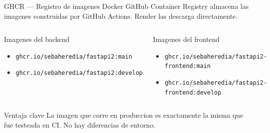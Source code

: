 \documentclass[aspectratio=169]{beamer}
\begin{document}
\begin{frame}{GHCR --- Registro de imagenes Docker}
  GitHub Container Registry almacena las imagenes construidas por GitHub Actions. Render las descarga directamente.

  \vspace{0.3cm}

  \begin{center}
  \end{center}

  \vspace{0.3cm}

  \begin{columns}
    \begin{block}{Imagenes del backend}
      \begin{itemize}
        \item \texttt{ghcr.io/sebaheredia/fastapi2:main}
        \item \texttt{ghcr.io/sebaheredia/fastapi2:develop}
      \end{itemize}
    \end{block}

    \begin{block}{Imagenes del frontend}
      \begin{itemize}
        \item \texttt{ghcr.io/sebaheredia/fastapi2-frontend:main}
        \item \texttt{ghcr.io/sebaheredia/fastapi2-frontend:develop}
      \end{itemize}
    \end{block}
  \end{columns}

  \vspace{0.3cm}
  \begin{exampleblock}{Ventaja clave}
    La imagen que corre en produccion es exactamente la misma que fue testeada en CI. No hay diferencias de entorno.
  \end{exampleblock}
\end{frame}
\end{document}
